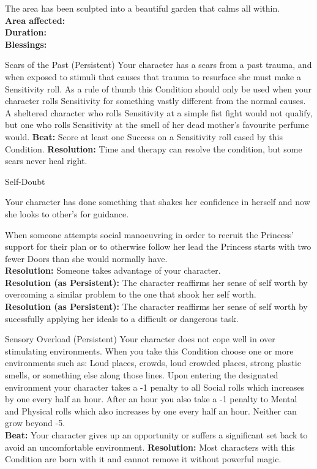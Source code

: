 \documentclass[10pt, frontgrid, backgrid]{flacards}
\begin{document}
{The area has been sculpted into a beautiful garden that calms all within. \\

\textbf{Area affected:} \fillunderline \\
\textbf{Duration:} \fillunderline \\
\textbf{Blessings:} \fillunderline }

\Cond
{Scars of the Past (Persistent)}
{Your character has a scars from a past trauma, and when exposed to stimuli that causes that trauma to resurface she must make a Sensitivity roll. As a rule of thumb this Condition should only be used when your character rolls Sensitivity for something vastly different from the normal causes. A sheltered character who rolls Sensitivity at a simple fist fight would not qualify, but one who rolls Sensitivity at the smell of her dead mother's favourite perfume would.   
\textbf{Beat:} Score at least one Success on a Sensitivity roll cased by this Condition.
\textbf{Resolution:} Time and therapy can resolve the condition, but some scars never heal right. 
}

\Cond
{Self-Doubt}
{Your character has done something that shakes her confidence in herself and now she looks to other's for guidance.

When someone attempts social manoeuvring in order to recruit the Princess' support for their plan or to otherwise follow her lead the Princess starts with two fewer Doors than she would normally have.\\
\textbf{Resolution:} Someone takes advantage of your character.\\
\textbf{Resolution (as Persistent):} The character reaffirms her sense of self worth by overcoming a similar problem to the one that shook her self worth.\\
\textbf{Resolution (as Persistent):} The character reaffirms her sense of self worth by sucessfully applying her ideals to a difficult or dangerous task.
}

\Cond
{Sensory Overload (Persistent)}
{Your character does not cope well in over stimulating environments. When you take this Condition choose one or more environments such as: Loud places, crowds, loud crowded places, strong plastic smells, or something else along those lines. Upon entering the designated environment your character takes a -1 penalty to all Social rolls which increases by one every half an hour. After an hour you also take a -1 penalty to Mental and Physical rolls which also increases by one every half an hour. Neither can grow beyond -5. \\
\textbf{Beat:} Your character gives up an opportunity or suffers a significant set back to avoid an uncomfortable environment. 
\textbf{Resolution:} Most characters with this Condition are born with it and cannot remove it without powerful magic.
}
\end{document}
